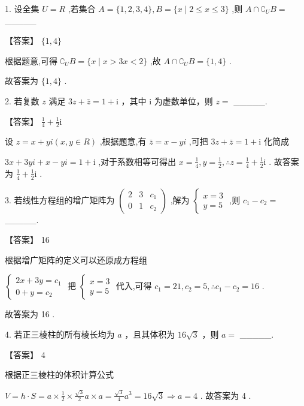 \documentclass[10pt]{article}
\begin{document}
1. 设全集 \(U = R\) ,若集合 \(A = \{ 1,2,3,4\} ,B = \{ x \mid  2 \leq  x \leq  3\}\) ,则 \(A \cap  {\complement }_{U}B =\) \_\_\_\_\_

【答案】 \(\{ 1,4\}\)

根据题意,可得 \({\complement }_{U}B = \{ x \mid  x > {3x} < 2\}\) ,故 \(A \cap  {\complement }_{U}B = \{ 1,4\}\) .

故答案为 \(\{ 1,4\}\) .

2. 若复数 \(z\) 满足 \({3z} + \bar{z} = 1 + \mathrm{i}\) ，其中 \(\mathrm{i}\) 为虚数单位，则 \(z =\) \_\_\_\_\_.

【答案】 \(\frac{1}{4} + \frac{1}{2}\mathrm{i}\)

设 \(z = x + {yi}\left( {x,y \in  R}\right)\) ,根据题意,有 \(\bar{z} = x - {yi}\) ,可把 \({3z} + \bar{z} = 1 + \mathrm{i}\) 化简成

\({3x} + {3yi} + x - {yi} = 1 + \mathrm{i}\) ,对于系数相等可得出 \(x = \frac{1}{4},y = \frac{1}{2},\therefore z = \frac{1}{4} + \frac{1}{2}\mathrm{i}\) . 故答案为 \(\frac{1}{4} + \frac{1}{2}\mathrm{i}\) .

3. 若线性方程组的增广矩阵为 \(\left( \begin{array}{lll} 2 & 3 & {c}_{1} \\  0 & 1 & {c}_{2} \end{array}\right)\) ,解为 \(\left\{  \begin{array}{l} x = 3 \\  y = 5 \end{array}\right.\) ,则 \({c}_{1} - {c}_{2} =\) \_\_\_\_\_.

【答案】 16

根据增广矩阵的定义可以还原成方程组

\(\left\{  {\begin{array}{l} {2x} + {3y} = {c}_{1} \\  0 + y = {c}_{2} \end{array}\text{ 把 }\left\{  \begin{array}{l} x = 3 \\  y = 5 \end{array}\right. }\right.\) 代入,可得 \({c}_{1} = {21},{c}_{2} = 5,\therefore {c}_{1} - {c}_{2} = {16}\) .

故答案为 16 .

4. 若正三棱柱的所有棱长均为 \(a\) ，且其体积为 \({16}\sqrt{3}\) ，则 \(a =\) \_\_\_\_\_.

【答案】 4

根据正三棱柱的体积计算公式

\(V = h \cdot  S = a \times  \frac{1}{2} \times  \frac{\sqrt{3}}{2}a \times  a = \frac{\sqrt{3}}{4}{a}^{3} = {16}\sqrt{3} \Rightarrow  a = 4\) . 故答案为 4 .
\end{document}
